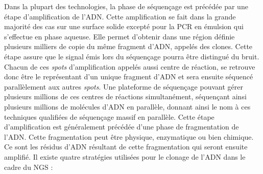 \documentclass[12pt,twoside]{reedthesis}
\theoremstyle{definition}
\theoremstyle{definition}
\theoremstyle{remark}
\begin{document}
  Dans la plupart des technologies, la phase de séquençage est précédée
  par une étape d'amplification de l'ADN. Cette amplification se fait dans
  la grande majorité des cas sur une surface solide excepté pour la PCR en
  émulsion qui s'effectue en phase aqueuse. Elle permet d'obtenir dans une
  région définie plusieurs milliers de copie du même fragment d'ADN,
  appelés des clones. Cette étape assure que le signal émis lors du
  séquençage pourra être distingué du bruit. Chacun de ces \emph{spots}
  d'amplification appelés aussi centre de réaction, se retrouve donc être
  le représentant d'un unique fragment d'ADN et sera ensuite séquencé
  parallèlement aux autres \emph{spots}. Une plateforme de séquençage
  pouvant gérer plusieurs millions de ces centres de réactions
  simultanément, séquençant ainsi plusieurs millions de molécules d'ADN en
  parallèle, donnant ainsi le nom à ces techniques qualifiées de
  séquençage massif en parallèle. Cette étape d'amplification est
  généralement précédée d'une phase de fragmentation de l'ADN. Cette
  fragmentation peut être physique, enzymatique ou bien chimique. Ce sont
  les résidus d'ADN résultant de cette fragmentation qui seront ensuite
  amplifié. Il existe quatre stratégies utilisées pour le clonage de l'ADN
  dans le cadre du NGS :
  
\end{document}
